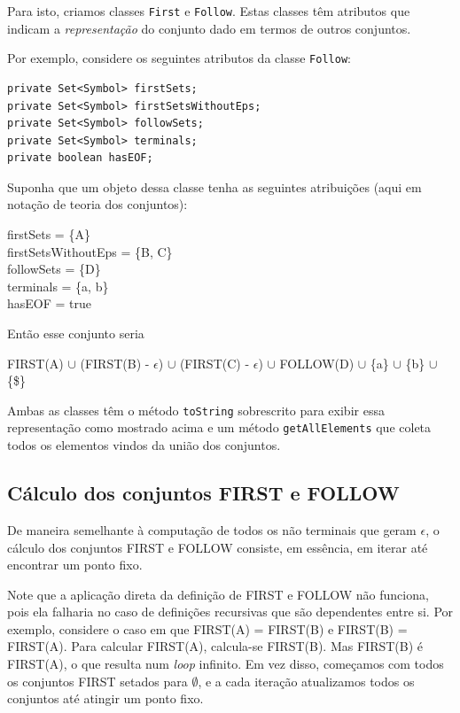 \documentclass[11pt]{article}
\begin{document}
Para isto, criamos classes \texttt{First} e \texttt{Follow}. Estas classes têm atributos que
indicam a \emph{representação} do conjunto dado em termos de outros conjuntos.

Por exemplo, considere os seguintes atributos da classe \texttt{Follow}:

\begin{verbatim}
private Set<Symbol> firstSets;
private Set<Symbol> firstSetsWithoutEps;
private Set<Symbol> followSets;
private Set<Symbol> terminals;
private boolean hasEOF;
\end{verbatim}

Suponha que um objeto dessa classe tenha as seguintes atribuições (aqui em
notação de teoria dos conjuntos):

\begin{center}
firstSets = \{A\} \\
firstSetsWithoutEps = \{B, C\} \\
followSets = \{D\} \\
terminals = \{a, b\} \\
hasEOF = true \\
\end{center}

Então esse conjunto seria

\begin{center}
FIRST(A) \(\cup\) (FIRST(B) - \(\epsilon\)) \(\cup\) (FIRST(C) - \(\epsilon\)) \(\cup\) FOLLOW(D)
\(\cup\) \{a\} \(\cup\) \{b\} \(\cup\) \{\$\}
\end{center}

Ambas as classes têm o método \texttt{toString} sobrescrito para exibir essa
representação como mostrado acima e um método \texttt{getAllElements} que coleta
todos os elementos vindos da união dos conjuntos.

\subsection{Cálculo dos conjuntos FIRST e FOLLOW}
\label{sec:orgheadline6}
De maneira semelhante à computação de todos os não terminais que geram \(\epsilon\),
o cálculo dos conjuntos FIRST e FOLLOW consiste, em essência, em iterar até
encontrar um ponto fixo.

Note que a aplicação direta da definição de FIRST e FOLLOW não funciona, pois
ela falharia no caso de definições recursivas que são dependentes entre
si. Por exemplo, considere o caso em que FIRST(A) = FIRST(B) e FIRST(B) =
FIRST(A). Para calcular FIRST(A), calcula-se FIRST(B). Mas FIRST(B) é FIRST(A),
o que resulta num \emph{loop} infinito. Em vez disso, começamos com todos os
conjuntos FIRST setados para \(\emptyset\), e a cada iteração atualizamos todos os
conjuntos até atingir um ponto fixo. 
\end{document}
